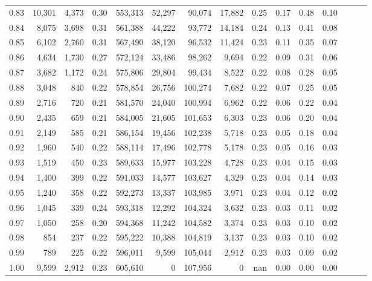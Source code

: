 \begin{tabular}{rrrrrrrrrrrrrrr}
0.83 &  10,301 &   4,373 &  0.30 &  553,313 &   52,297 &   90,074 &   17,882 &  0.25 &  0.17 &  0.48 &      0.10 \\
0.84 &   8,075 &   3,698 &  0.31 &  561,388 &   44,222 &   93,772 &   14,184 &  0.24 &  0.13 &  0.41 &      0.08 \\
0.85 &   6,102 &   2,760 &  0.31 &  567,490 &   38,120 &   96,532 &   11,424 &  0.23 &  0.11 &  0.35 &      0.07 \\
0.86 &   4,634 &   1,730 &  0.27 &  572,124 &   33,486 &   98,262 &    9,694 &  0.22 &  0.09 &  0.31 &      0.06 \\
0.87 &   3,682 &   1,172 &  0.24 &  575,806 &   29,804 &   99,434 &    8,522 &  0.22 &  0.08 &  0.28 &      0.05 \\
0.88 &   3,048 &     840 &  0.22 &  578,854 &   26,756 &  100,274 &    7,682 &  0.22 &  0.07 &  0.25 &      0.05 \\
0.89 &   2,716 &     720 &  0.21 &  581,570 &   24,040 &  100,994 &    6,962 &  0.22 &  0.06 &  0.22 &      0.04 \\
0.90 &   2,435 &     659 &  0.21 &  584,005 &   21,605 &  101,653 &    6,303 &  0.23 &  0.06 &  0.20 &      0.04 \\
0.91 &   2,149 &     585 &  0.21 &  586,154 &   19,456 &  102,238 &    5,718 &  0.23 &  0.05 &  0.18 &      0.04 \\
0.92 &   1,960 &     540 &  0.22 &  588,114 &   17,496 &  102,778 &    5,178 &  0.23 &  0.05 &  0.16 &      0.03 \\
0.93 &   1,519 &     450 &  0.23 &  589,633 &   15,977 &  103,228 &    4,728 &  0.23 &  0.04 &  0.15 &      0.03 \\
0.94 &   1,400 &     399 &  0.22 &  591,033 &   14,577 &  103,627 &    4,329 &  0.23 &  0.04 &  0.14 &      0.03 \\
0.95 &   1,240 &     358 &  0.22 &  592,273 &   13,337 &  103,985 &    3,971 &  0.23 &  0.04 &  0.12 &      0.02 \\
0.96 &   1,045 &     339 &  0.24 &  593,318 &   12,292 &  104,324 &    3,632 &  0.23 &  0.03 &  0.11 &      0.02 \\
0.97 &   1,050 &     258 &  0.20 &  594,368 &   11,242 &  104,582 &    3,374 &  0.23 &  0.03 &  0.10 &      0.02 \\
0.98 &     854 &     237 &  0.22 &  595,222 &   10,388 &  104,819 &    3,137 &  0.23 &  0.03 &  0.10 &      0.02 \\
0.99 &     789 &     225 &  0.22 &  596,011 &    9,599 &  105,044 &    2,912 &  0.23 &  0.03 &  0.09 &      0.02 \\
1.00 &   9,599 &   2,912 &  0.23 &  605,610 &        0 &  107,956 &        0 &   nan &  0.00 &  0.00 &      0.00 \\
\bottomrule
\end{tabular}
